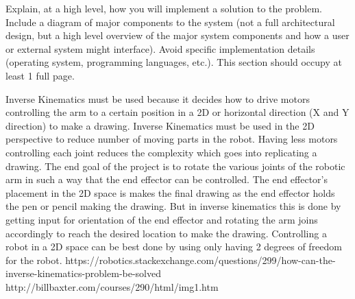 Explain, at a high level, how you will implement a solution to the problem. Include a diagram of major components to the system (not a full architectural design, but a high level overview of the major system components and how a user or external system might interface). Avoid specific implementation details (operating system, programming languages, etc.). This section should occupy at least 1 full page.

Inverse Kinematics must be used because it decides how to drive motors controlling the arm to a certain position in a 2D or horizontal direction (X and Y direction) to make a drawing. Inverse Kinematics must be used in the 2D perspective to reduce number of moving parts in the robot. Having less motors controlling each joint reduces the complexity which goes into replicating a drawing. The end goal of the project is to rotate the various joints of the robotic arm in such a way that the end effector can be controlled. The end effector’s placement in the 2D space is makes the final drawing as the end effector holds the pen or pencil making the drawing. But in inverse kinematics this is done by getting input for orientation of the end effector and rotating the arm joins accordingly to reach the desired location to make the drawing. 
Controlling a robot in a 2D space can be best done by using only having 2 degrees of freedom for the robot. 
https://robotics.stackexchange.com/questions/299/how-can-the-inverse-kinematics-problem-be-solved
http://billbaxter.com/courses/290/html/img1.htm
